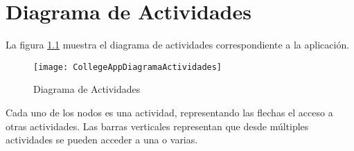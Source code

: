 %
%
%
%

\cleardoublepage
\chapter{Diagrama de Actividades}
\label{chap:activitiesdiagram}

La figura \ref{fig:ActivitiesDiagram} muestra el diagrama de actividades correspondiente a la aplicación.

\begin{figure}[h !]
	\centering
	\texttt{[image: CollegeAppDiagramaActividades]}
	\caption{Diagrama de Actividades}
	\label{fig:ActivitiesDiagram}
\end{figure}

Cada uno de los nodos es una actividad, representando las flechas el acceso a otras actividades. Las barras verticales representan que desde múltiples actividades se pueden acceder a una o varias.